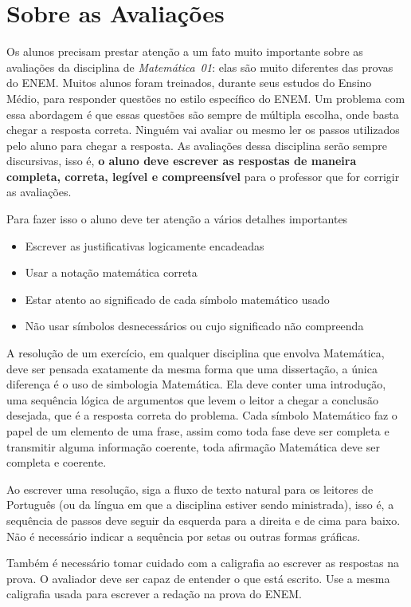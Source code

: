 \section{Sobre as Avaliações}

Os alunos precisam prestar atenção a um fato muito importante sobre as avaliações da disciplina de \emph{Matemática~01}:
elas são muito diferentes das provas do ENEM.
Muitos alunos foram treinados, durante seus estudos do Ensino Médio, para responder questões
no estilo específico do ENEM. Um problema com essa abordagem é que essas questões são 
sempre de múltipla escolha, onde basta chegar a resposta correta. Ninguém 
vai avaliar ou mesmo ler os passos utilizados pelo aluno para chegar a resposta.
As avaliações dessa disciplina serão sempre discursivas, isso é, \textbf{o aluno deve escrever
as respostas de maneira completa, correta, legível e compreensível} para o professor que 
for corrigir as avaliações.

Para fazer isso o aluno deve ter atenção a vários detalhes importantes
\begin{itemize}
    \item Escrever as justificativas logicamente encadeadas
    \item Usar a notação matemática correta
    \item Estar atento ao significado de cada símbolo matemático usado
    \item Não usar símbolos desnecessários ou cujo significado não compreenda
\end{itemize}

A resolução de um exercício, em qualquer disciplina que envolva Matemática, deve ser pensada exatamente da mesma forma
que uma dissertação, a única diferença é o uso de simbologia Matemática. Ela deve conter uma introdução, 
uma sequência lógica de argumentos que levem o leitor a chegar a conclusão desejada, que é a resposta correta
do problema. Cada símbolo Matemático faz o papel de um elemento de uma frase, assim como toda fase deve 
ser completa e transmitir alguma informação coerente, toda afirmação Matemática deve ser completa e coerente.

Ao escrever uma resolução, siga a fluxo de texto natural para os leitores de Português (ou da língua em que a disciplina
estiver sendo ministrada), isso é, a sequência de passos deve seguir da esquerda para a direita e de cima para baixo.
Não é necessário indicar a sequência por setas ou outras formas gráficas. 

Também é necessário tomar cuidado com a caligrafia ao escrever as respostas na prova. O avaliador deve ser capaz
de entender o que está escrito. Use a mesma caligrafia usada para escrever a redação na prova do ENEM.

